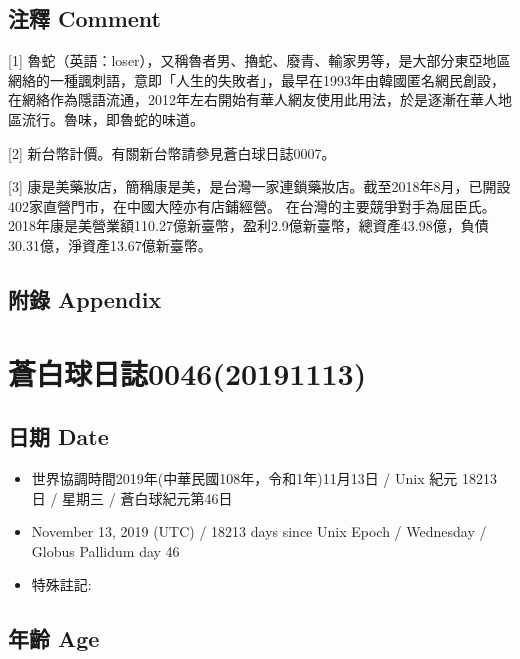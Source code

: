 \documentclass[a5paper, 12pt
]{book}
\providecommand{\tightlist}{%
  \setlength{\itemsep}{0pt}\setlength{\parskip}{0pt}}
\begin{document}
\hypertarget{ux6ce8ux91cb-comment-38}{%
\subsection{注釋 Comment}\label{ux6ce8ux91cb-comment-38}}

{[}1{]}
魯蛇（英語：loser），又稱魯者男、擼蛇、廢青、輸家男等，是大部分東亞地區網絡的一種諷刺語，意即「人生的失敗者」，最早在1993年由韓國匿名網民創設，在網絡作為隱語流通，2012年左右開始有華人網友使用此用法，於是逐漸在華人地區流行。魯味，即魯蛇的味道。

{[}2{]} 新台幣計價。有關新台幣請參見蒼白球日誌0007。

{[}3{]}
康是美藥妝店，簡稱康是美，是台灣一家連鎖藥妝店。截至2018年8月，已開設402家直營門市，在中國大陸亦有店鋪經營。
在台灣的主要競爭對手為屈臣氏。
2018年康是美營業額110.27億新臺幣，盈利2.9億新臺幣，總資產43.98億，負債30.31億，淨資產13.67億新臺幣。

\hypertarget{ux9644ux9304-appendix-37}{%
\subsection{附錄 Appendix}\label{ux9644ux9304-appendix-37}}

\hypertarget{ux84bcux767dux7403ux65e5ux8a8c004620191113}{%
\section{蒼白球日誌0046(20191113)}\label{ux84bcux767dux7403ux65e5ux8a8c004620191113}}

\hypertarget{ux65e5ux671f-date-45}{%
\subsection{日期 Date}\label{ux65e5ux671f-date-45}}

\begin{itemize}
\tightlist
\item
  世界協調時間2019年(中華民國108年，令和1年)11月13日 / Unix 紀元 18213
  日 / 星期三 / 蒼白球紀元第46日
\item
  November 13, 2019 (UTC) / 18213 days since Unix Epoch / Wednesday /
  Globus Pallidum day 46
\item
  特殊註記:
\end{itemize}

\hypertarget{ux5e74ux9f61-age-45}{%
\subsection{年齡 Age}\label{ux5e74ux9f61-age-45}}
\end{document}
